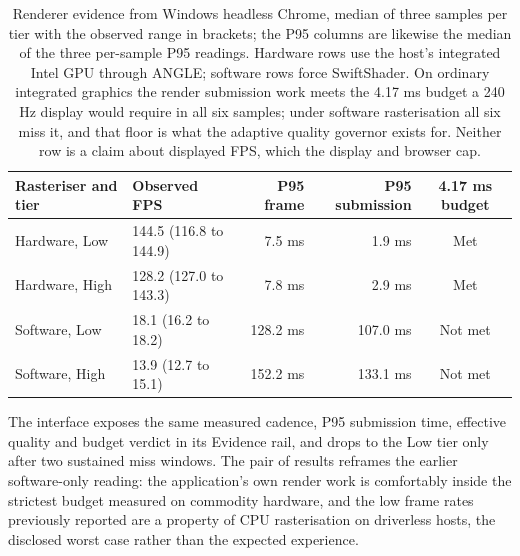 \documentclass[11pt,a4paper]{report}
\begin{document}
\begin{table}[h]
\centering\small
\renewcommand{\arraystretch}{1.2}
\begin{tabular}{llrrc}
\toprule
Rasteriser and tier & Observed FPS & P95 frame & P95 submission & 4.17 ms budget \\
\midrule
Hardware, Low & 144.5 (116.8 to 144.9) & 7.5 ms & 1.9 ms & Met \\
Hardware, High & 128.2 (127.0 to 143.3) & 7.8 ms & 2.9 ms & Met \\
Software, Low & 18.1 (16.2 to 18.2) & 128.2 ms & 107.0 ms & Not met \\
Software, High & 13.9 (12.7 to 15.1) & 152.2 ms & 133.1 ms & Not met \\
\bottomrule
\end{tabular}
\caption{Renderer evidence from Windows headless Chrome, median of three samples per tier with the observed range in brackets; the P95 columns are likewise the median of the three per-sample P95 readings. Hardware rows use the host's integrated Intel GPU through ANGLE; software rows force SwiftShader. On ordinary integrated graphics the render submission work meets the 4.17 ms budget a 240 Hz display would require in all six samples; under software rasterisation all six miss it, and that floor is what the adaptive quality governor exists for. Neither row is a claim about displayed FPS, which the display and browser cap.}
\label{tab:renderer}
\end{table}

The interface exposes the same measured cadence, P95 submission time, effective quality and budget verdict in its Evidence rail, and drops to the Low tier only after two sustained miss windows. The pair of results reframes the earlier software-only reading: the application's own render work is comfortably inside the strictest budget measured on commodity hardware, and the low frame rates previously reported are a property of CPU rasterisation on driverless hosts, the disclosed worst case rather than the expected experience.
\end{document}
